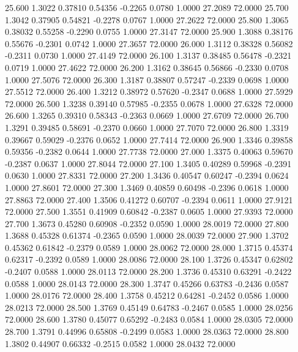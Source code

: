   25.600   1.3022   0.37810   0.54356  -0.2265   0.0780   1.0000  27.2089  72.0000
  25.700   1.3042   0.37905   0.54821  -0.2278   0.0767   1.0000  27.2622  72.0000
  25.800   1.3065   0.38032   0.55258  -0.2290   0.0755   1.0000  27.3147  72.0000
  25.900   1.3088   0.38176   0.55676  -0.2301   0.0742   1.0000  27.3657  72.0000
  26.000   1.3112   0.38328   0.56082  -0.2311   0.0730   1.0000  27.4149  72.0000
  26.100   1.3137   0.38485   0.56478  -0.2321   0.0719   1.0000  27.4622  72.0000
  26.200   1.3162   0.38645   0.56866  -0.2330   0.0708   1.0000  27.5076  72.0000
  26.300   1.3187   0.38807   0.57247  -0.2339   0.0698   1.0000  27.5512  72.0000
  26.400   1.3212   0.38972   0.57620  -0.2347   0.0688   1.0000  27.5929  72.0000
  26.500   1.3238   0.39140   0.57985  -0.2355   0.0678   1.0000  27.6328  72.0000
  26.600   1.3265   0.39310   0.58343  -0.2363   0.0669   1.0000  27.6709  72.0000
  26.700   1.3291   0.39485   0.58691  -0.2370   0.0660   1.0000  27.7070  72.0000
  26.800   1.3319   0.39667   0.59029  -0.2376   0.0652   1.0000  27.7414  72.0000
  26.900   1.3346   0.39858   0.59356  -0.2382   0.0644   1.0000  27.7738  72.0000
  27.000   1.3375   0.40063   0.59670  -0.2387   0.0637   1.0000  27.8044  72.0000
  27.100   1.3405   0.40289   0.59968  -0.2391   0.0630   1.0000  27.8331  72.0000
  27.200   1.3436   0.40547   0.60247  -0.2394   0.0624   1.0000  27.8601  72.0000
  27.300   1.3469   0.40859   0.60498  -0.2396   0.0618   1.0000  27.8863  72.0000
  27.400   1.3506   0.41272   0.60707  -0.2394   0.0611   1.0000  27.9121  72.0000
  27.500   1.3551   0.41909   0.60842  -0.2387   0.0605   1.0000  27.9393  72.0000
  27.700   1.3673   0.45280   0.60908  -0.2352   0.0590   1.0000  28.0019  72.0000
  27.800   1.3688   0.45328   0.61374  -0.2365   0.0590   1.0000  28.0039  72.0000
  27.900   1.3702   0.45362   0.61842  -0.2379   0.0589   1.0000  28.0062  72.0000
  28.000   1.3715   0.45374   0.62317  -0.2392   0.0589   1.0000  28.0086  72.0000
  28.100   1.3726   0.45347   0.62802  -0.2407   0.0588   1.0000  28.0113  72.0000
  28.200   1.3736   0.45310   0.63291  -0.2422   0.0588   1.0000  28.0143  72.0000
  28.300   1.3747   0.45266   0.63783  -0.2436   0.0587   1.0000  28.0176  72.0000
  28.400   1.3758   0.45212   0.64281  -0.2452   0.0586   1.0000  28.0213  72.0000
  28.500   1.3769   0.45149   0.64783  -0.2467   0.0585   1.0000  28.0256  72.0000
  28.600   1.3780   0.45077   0.65292  -0.2483   0.0584   1.0000  28.0305  72.0000
  28.700   1.3791   0.44996   0.65808  -0.2499   0.0583   1.0000  28.0363  72.0000
  28.800   1.3802   0.44907   0.66332  -0.2515   0.0582   1.0000  28.0432  72.0000
